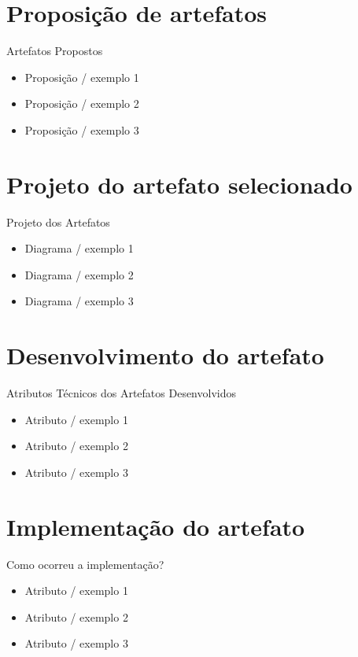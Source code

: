 \section{Proposição de artefatos}
\begin{frame}{Artefatos Propostos}
	\begin{itemize}
		\item Proposição / exemplo 1
		\item Proposição / exemplo 2
		\item Proposição / exemplo 3
	\end{itemize}
\end{frame}

\section{Projeto do artefato selecionado}
\begin{frame}{Projeto dos Artefatos}
	\begin{itemize}
		\item Diagrama / exemplo 1
		\item Diagrama / exemplo 2
		\item Diagrama / exemplo 3
	\end{itemize}
\end{frame}

\section{Desenvolvimento do artefato}
\begin{frame}{Atributos Técnicos dos Artefatos Desenvolvidos}
	\begin{itemize}
		\item Atributo / exemplo 1
		\item Atributo / exemplo 2
		\item Atributo / exemplo 3
	\end{itemize}
\end{frame}

\section{Implementação do artefato}
\begin{frame}{Como ocorreu a implementação?}
	\begin{itemize}
		\item Atributo / exemplo 1
		\item Atributo / exemplo 2
		\item Atributo / exemplo 3
	\end{itemize}
\end{frame}

